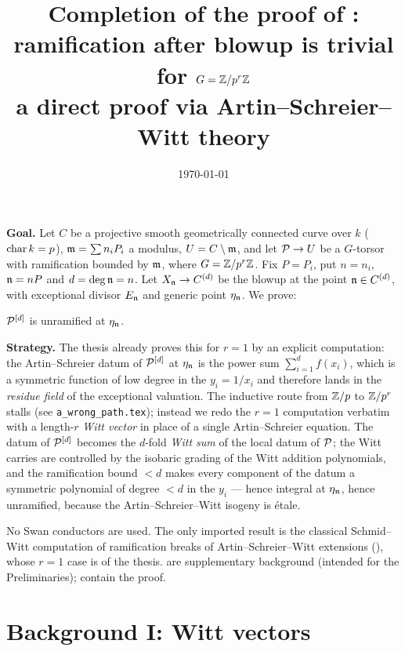 \documentclass[11pt]{article}
\title{Completion of the proof of
\texorpdfstring{\Cref{theorem:ramification_after_blowup_is_tame_for_p_power}}{Theorem 49}:\\
ramification after blowup is trivial for $G=\mathbb{Z}/p^r\mathbb{Z}$\\[4pt]
{\large a direct proof via Artin--Schreier--Witt theory}}
\author{}
\date{\today}
\begin{document}
\maketitle

\noindent\textbf{Goal.}
Let $C$ be a projective smooth geometrically connected curve over $k$
($\operatorname{char} k = p$), $\mathfrak{m}=\sum n_iP_i$ a modulus, $U=C\setminus\mathfrak{m}$, and let
$\mathcal{P}\to U$ be a $G$-torsor with ramification bounded by $\mathfrak{m}$, where
$G=\mathbb{Z}/p^r\mathbb{Z}$.  Fix $P=P_i$, put $n=n_i$, $\mathfrak{n}=nP$ and $d=\deg\mathfrak{n}=n$.  Let
$X_{\mathfrak{n}}\to C^{(d)}$ be the blowup at the point $\mathfrak{n}\in C^{(d)}$, with
exceptional divisor $E_{\mathfrak{n}}$ and generic point $\eta_{\mathfrak{n}}$.  We prove:

\begin{theorem*}[{= \Cref{theorem:ramification_after_blowup_is_tame_for_p_power}}]
$\mathcal{P}^{[d]}$ is unramified at $\eta_{\mathfrak{n}}$.
\end{theorem*}

\noindent\textbf{Strategy.}
The thesis already proves this for $r=1$ by an explicit computation: the
Artin--Schreier datum of $\mathcal{P}^{[d]}$ at $\eta_{\mathfrak{n}}$ is the power sum
$\sum_{i=1}^d f(x_i)$, which is a symmetric function of low degree in the
$y_i=1/x_i$ and therefore lands in the \emph{residue field} of the
exceptional valuation.  The inductive route from $\mathbb{Z}/p$ to $\mathbb{Z}/p^r$ stalls
(see \texttt{a\_wrong\_path.tex}); instead we redo the $r=1$ computation
verbatim with a length-$r$ \emph{Witt vector} in place of a single
Artin--Schreier equation.  The datum of $\mathcal{P}^{[d]}$ becomes the $d$-fold
\emph{Witt sum} of the local datum of $\mathcal{P}$; the Witt carries are controlled
by the isobaric grading of the Witt addition polynomials, and the
ramification bound $<d$ makes every component of the datum a symmetric
polynomial of degree $<d$ in the $y_i$ --- hence integral at $\eta_{\mathfrak{n}}$,
hence unramified, because the Artin--Schreier--Witt isogeny is \'etale.

No Swan conductors are used.  The only imported result is the classical
Schmid--Witt computation of ramification breaks of Artin--Schreier--Witt
extensions (\cite{Thomas2005}), whose $r=1$ case is
 of the thesis.
 are supplementary background (intended for the
Preliminaries);  contain the proof.

\section{Background I: Witt vectors}\label{sec:witt}
\end{document}
